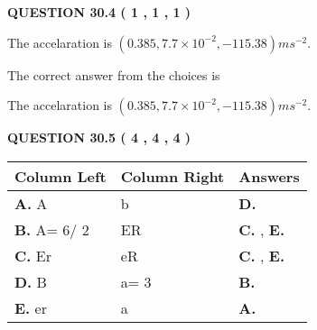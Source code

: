 \documentclass[12pt]{article}
\begin{document}
 
  
\vspace{0.2in}
  
{\textbf{\Large{QUESTION
30.4 
 (           1 ,           1 ,           1 )
}}}
  
  


 
 
\noindent{}
 
 
The accelaration is $  %
(
0.385,
7.7 \times 10^{-2},
-115.38)
ms^{-2} $.
 
 
 
 
 
 
\noindent{}

The correct answer from the choices is


The accelaration is $  %
(
0.385,
7.7 \times 10^{-2},
-115.38)
ms^{-2} $.
 
 
 
  
\vspace{0.2in}
  
{\textbf{\Large{QUESTION
30.5 
 (           4 ,           4 ,           4 )
}}}
  
  
 
 
\noindent{}
  
  
\begin{tabular}{|l|l|l|}
 \hline
 Column Left & Column Right  & Answers       \\ 
 \hline
{\textbf{\large{
A.}}}
A
  & 
b
 & 
{\textbf{\large{
D.}}}
 \\ 
 \hline
{\textbf{\large{
B.}}}
 A= %
6/ %
2

  & 
ER
 & 
{\textbf{\large{
C.}}}
, 
{\textbf{\large{
E.}}}
 \\ 
 \hline
{\textbf{\large{
C.}}}
Er
  & 
eR
 & 
{\textbf{\large{
C.}}}
, 
{\textbf{\large{
E.}}}
 \\ 
 \hline
{\textbf{\large{
D.}}}
B
  & 
 a= %
3
 & 
{\textbf{\large{
B.}}}
 \\ 
 \hline
{\textbf{\large{
E.}}}
er
  & 
a
 & 
{\textbf{\large{
A.}}}
 \\ 
 \hline
 \end{tabular}
  
  
 
 
 
 
  
\end{document}
